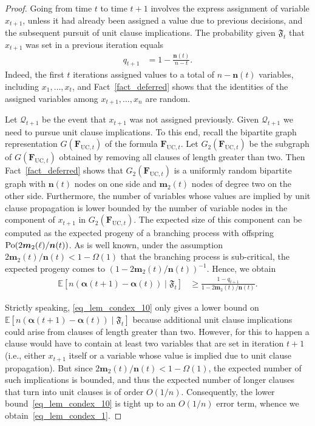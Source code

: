 \documentclass[10pt,reqno]{amsart}
\numberwithin{equation}{section}
\renewcommand{\vec}[1]{\boldsymbol{#1}}
\newcommand{\FUC}[1]{\PHI_{\mathrm{UC},{#1}}}
\newcommand\PHI{\vec F}
\newcommand\cQ{\mathcal Q}
\newcommand\fF{\mathfrak F}
\newcommand\vm{\vec m}
\newcommand\vn{\vec n}
\newcommand\Erw{\mathbb{E}}
\newcommand\ex{\Erw}
\newcommand{\Po}{{\rm Po}}
\newcommand\brk[1]{\left\lbrack{#1}\right\rbrack}
\begin{document}
\begin{proof}
	Going from time $t$ to time $t+1$ involves the express assignment of variable $x_{t+1}$, unless it had already been assigned a value due to previous decisions, and the subsequent pursuit of unit clause implications.
	The probability given $\fF_t$ that $x_{t+1}$ was set in a previous iteration equals
	\begin{align}\label{eqqt+1}
		q_{t+1}&=1-\frac{\vn(t)}{n-t}.
\end{align}
	Indeed, the first $t$ iterations assigned values to a total of $n-\vn(t)$ variables,   including $x_1,\ldots,x_{t}$, and Fact~\ref{fact_deferred} shows that the identities of the assigned variables among $x_{t+1},\ldots,x_{n}$ are random.

	Let $\cQ_{t+1}$ be the event that $x_{t+1}$ was not assigned previously.
	Given $\cQ_{t+1}$ we need to pursue unit clause implications.
	To this end, recall the bipartite graph representation $G(\FUC t)$ of the formula $\FUC t$.
	Let $G_2(\FUC t)$ be the subgraph of $G(\FUC t)$ obtained by removing all clauses of length greater than two.
	Then Fact~\ref{fact_deferred} shows that $G_2(\FUC t)$ is a uniformly random bipartite graph with $\vn(t)$ nodes on one side and $\vm_2(t)$ nodes of degree two on the other side.
	Furthermore, the number of variables whose values are implied by unit clause propagation is lower bounded by the number of variable nodes in the component of $x_{t+1}$ in $G_2(\FUC t)$.
	The expected size of this component can be computed as the expected progeny of a branching process with offspring $\Po(2\vm_2(\ell)/\vn(t))$.
	As is well known, under the assumption $2\vm_2(t)/\vn(t)<1-\Omega(1)$ that the branching process is sub-critical, the expected progeny comes to $(1-2\vm_2(t)/\vn(t))^{-1}$.
	Hence, we obtain
	\begin{align}\label{eq_lem_condex_10}
		\ex\brk{n(\vec\alpha(t+1)-\vec\alpha(t))\mid\fF_t}&\geq\frac{1-q_{t+1}}{1-2\vm_2(t)/\vn(t)}.
	\end{align}

	Strictly speaking, \eqref{eq_lem_condex_10} only gives a lower bound on $\ex\brk{n(\vec\alpha(t+1)-\vec\alpha(t))\mid\fF_t}$ because additional unit clause implications could arise from clauses of length greater than two.
	However, for this to happen a clause would have to contain at least two variables that are set in iteration $t+1$ (i.e., either $x_{t+1}$ itself or a variable whose value is implied due to unit clause propagation).
	But since $2\vm_2(t)/\vn(t)<1-\Omega(1)$, the expected number of such implications is bounded, and thus the expected number of longer clauses that turn into unit clauses is of order $O(1/n)$.
	Consequently, the lower bound~\eqref{eq_lem_condex_10} is tight up to an $O(1/n)$ error term, whence we obtain~\eqref{eq_lem_condex_1}.


\end{proof}
\end{document}

